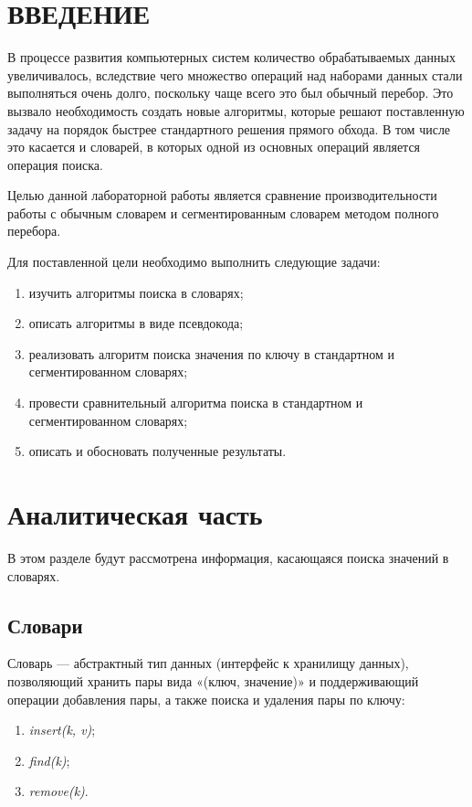 \chapter*{ВВЕДЕНИЕ}

В процессе развития компьютерных систем количество обрабатываемых данных увеличивалось, вследствие чего множество операций над наборами данных стали выполняться очень долго, поскольку чаще всего это был обычный перебор. 
Это вызвало необходимость создать новые алгоритмы, которые решают поставленную задачу на порядок быстрее стандартного решения прямого обхода. 
В том числе это касается и словарей, в которых одной из основных операций является операция поиска.

Целью данной лабораторной работы является сравнение производительности работы с обычным словарем и сегментированным словарем методом полного перебора.

Для поставленной цели необходимо выполнить следующие задачи:
\begin{enumerate}
    \item изучить алгоритмы поиска в словарях;
    \item описать алгоритмы в виде псевдокода;
    \item реализовать алгоритм поиска значения по ключу в стандартном и сегментированном словарях;
    \item провести сравнительный алгоритма поиска в стандартном и сегментированном словарях;
    \item описать и обосновать полученные результаты.
\end{enumerate}


\chapter{Аналитическая часть}
В этом разделе будут рассмотрена информация, касающаяся поиска значений в словарях.


\section{Словари}
Словарь \cite{dict} --- абстрактный тип данных (интерфейс к хранилищу данных), позволяющий хранить пары вида «(ключ, значение)» и поддерживающий операции добавления пары, а также поиска и удаления пары по ключу:
\begin{enumerate}
	\item \textit{insert(k, v)};
	\item \textit{find(k)};
	\item \textit{remove(k)}.
\end{enumerate}

